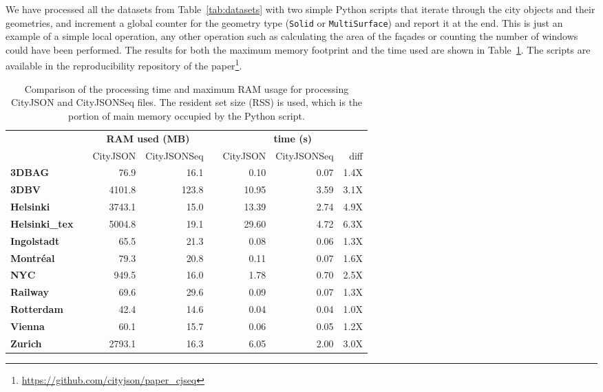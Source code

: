 \documentclass{isprs} %
\begin{document}
We have processed all the datasets from Table~\ref{tab:datasets} with two simple Python scripts that iterate through the city objects and their geometries, and increment a global counter for the geometry type (\texttt{Solid} or \texttt{MultiSurface}) and report it at the end.
This is just an example of a simple local operation, any other operation such as calculating the area of the façades or counting the number of windows could have been performed.
The results for both the maximum memory footprint and the time used are shown in Table~\ref{tab:ramtime}.
The scripts are available in the reproducibility repository of the paper\footnote{\url{https://github.com/cityjson/paper_cjseq}}.
\begin{table}
  \centering
  \caption{Comparison of the processing time and maximum RAM usage for processing CityJSON and CityJSONSeq files. The resident set size (RSS) is used, which is the portion of main memory occupied by the Python script.}
  \small
  \begin{tabular}
    {@{}lcrrcrrr@{}}\toprule
    &&  \multicolumn{2}{c}{\textbf{RAM used (MB)}} && \multicolumn{3}{c}{\textbf{time (s)}} \\ 
    \cmidrule{3-4} \cmidrule{6-8} 
     && CityJSON & CityJSONSeq && CityJSON & CityJSONSeq & diff \\
    \midrule
     \textbf{3DBAG}         &&   76.9 &  16.1  &&   0.10 & 0.07 & 1.4X \\
     \textbf{3DBV}          && 4101.8 & 123.8  &&  10.95 & 3.59 & 3.1X \\
     \textbf{Helsinki}      && 3743.1 &  15.0  &&  13.39 & 2.74 & 4.9X \\
     \textbf{Helsinki\_tex} && 5004.8 &  19.1  &&  29.60 & 4.72 & 6.3X \\
     \textbf{Ingolstadt}    &&   65.5 &  21.3  &&   0.08 & 0.06 & 1.3X \\
     \textbf{Montréal}      &&   79.3 &  20.8  &&   0.11 & 0.07 & 1.6X \\
     \textbf{NYC}           &&  949.5 &  16.0  &&   1.78 & 0.70 & 2.5X \\
     \textbf{Railway}       &&   69.6 &  29.6  &&   0.09 & 0.07 & 1.3X \\
     \textbf{Rotterdam}     &&   42.4 &  14.6  &&   0.04 & 0.04 & 1.0X \\
     \textbf{Vienna}        &&   60.1 &  15.7  &&   0.06 & 0.05 & 1.2X \\
     \textbf{Zurich}        && 2793.1 &  16.3  &&   6.05 & 2.00 & 3.0X \\
    \bottomrule
  \end{tabular}%
  \label{tab:ramtime}
\end{table}
\end{document}
